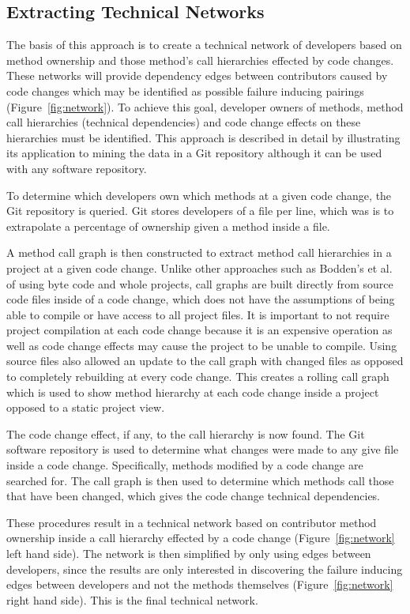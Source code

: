 \documentclass[conference]{IEEEtran}
\begin{document}
\subsection{Extracting Technical Networks}
The basis of this approach is to create a technical network of developers based on method ownership
and those method's call hierarchies effected by code changes. These networks will provide
dependency edges between contributors caused by code changes which may be 
identified as possible failure inducing pairings (Figure~\ref{fig:network}). To achieve this goal,
developer owners of methods, method call hierarchies (technical
dependencies) and code change effects on these hierarchies must be identified.
This approach is described in detail by illustrating its application to mining the data in a Git
repository although it can be used with any software repository.

To determine which developers own which methods at a given code change,
the Git repository is queried. Git stores developers of a file per line, which was is to extrapolate
a percentage of ownership given a method inside a file.

A method call graph is then constructed to extract method call hierarchies in a project at a given code change. 
Unlike other approaches such as Bodden's et al.~\cite{Bodden:2003:HVJ} 
of using byte code and whole projects, call graphs are built directly from source code files
inside of a code change, 
which does not have the assumptions of being able to compile or have access to all project 
files. It is important to not require project compilation at each code change because it is
an expensive operation as well as code change effects may cause the project
to be unable to compile. Using source files also allowed an update to the call graph
with changed files as opposed to completely rebuilding at 
every code change. This creates a rolling call graph which 
is used to show method hierarchy at each code change inside a project opposed to
a static project view.

The code change effect, if any, to the call hierarchy is now found. The Git
software repository is used to determine what changes were made to any give file inside a 
code change. Specifically, methods modified by a code change are searched for. The call graph 
is then used to determine which methods call those that have been changed, which
gives the code change technical dependencies.

These procedures result in a technical network based on contributor method ownership 
inside a call hierarchy effected by a code change (Figure~\ref{fig:network} left hand side).
The network is then simplified by only using edges between developers, since the results
are only interested in discovering the failure inducing edges between developers and not the 
methods themselves (Figure~\ref{fig:network} right hand side). This is the final technical 
network.
\end{document}
